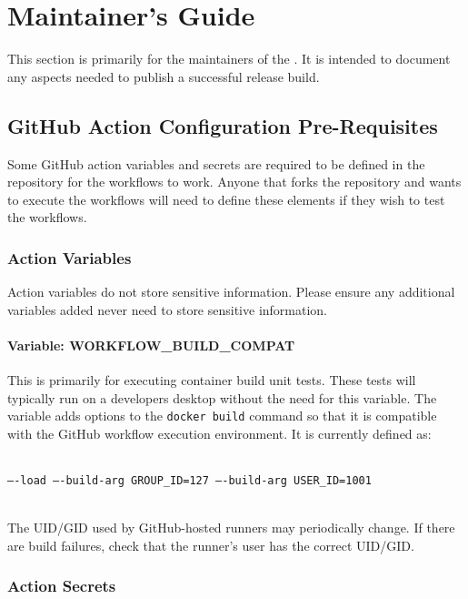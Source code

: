 \chapter{\cxtoolkit Maintainer's Guide}\label{chap:maintainers_guide}


This section is primarily for the maintainers of the \cxtoolkit.  It is intended
to document any aspects needed to publish a successful release build.


\section{GitHub Action Configuration Pre-Requisites}

Some GitHub action variables and secrets are required to be defined in the repository
for the workflows to work.  Anyone that forks the repository and wants to execute
the workflows will need to define these elements if they wish to test the workflows.

\subsection{Action Variables}

Action variables do not store sensitive information.  Please ensure any additional
variables added never need to store sensitive information.

\subsubsection{Variable: WORKFLOW\_BUILD\_COMPAT}

This is primarily for executing container build unit tests.  These tests will typically
run on a developers desktop without the need for this variable.  The variable adds options
to the \texttt{docker build} command so that it is compatible with the GitHub workflow
execution environment.  It is currently defined as:

\noindent\\\texttt{----load ----build-arg GROUP\_ID=127 ----build-arg USER\_ID=1001}

\noindent\\The UID/GID used by GitHub-hosted runners may periodically change. If 
there are build failures, check that the runner's user has the correct UID/GID.

\subsection{Action Secrets}

